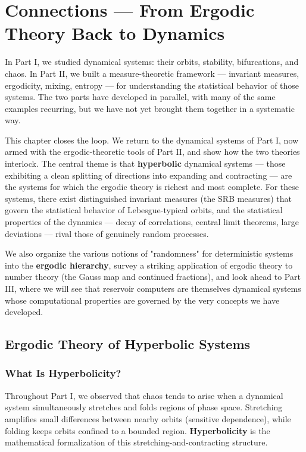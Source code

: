 \chapter{Connections — From Ergodic Theory Back to Dynamics}\label{ch:12}

In Part I, we studied dynamical systems: their orbits, stability, bifurcations, and chaos. In Part II, we built a measure-theoretic framework --- invariant measures, ergodicity, mixing, entropy --- for understanding the statistical behavior of those systems. The two parts have developed in parallel, with many of the same examples recurring, but we have not yet brought them together in a systematic way.

This chapter closes the loop. We return to the dynamical systems of Part I, now armed with the ergodic-theoretic tools of Part II, and show how the two theories interlock. The central theme is that \textbf{hyperbolic} dynamical systems --- those exhibiting a clean splitting of directions into expanding and contracting --- are the systems for which the ergodic theory is richest and most complete. For these systems, there exist distinguished invariant measures (the SRB measures) that govern the statistical behavior of Lebesgue-typical orbits, and the statistical properties of the dynamics --- decay of correlations, central limit theorems, large deviations --- rival those of genuinely random processes.

We also organize the various notions of "randomness" for deterministic systems into the \textbf{ergodic hierarchy}, survey a striking application of ergodic theory to number theory (the Gauss map and continued fractions), and look ahead to Part III, where we will see that reservoir computers are themselves dynamical systems whose computational properties are governed by the very concepts we have developed.


\section{Ergodic Theory of Hyperbolic Systems}\label{sec:12.1}

\subsection{What Is Hyperbolicity?}\label{sec:12.1.1}

Throughout Part I, we observed that chaos tends to arise when a dynamical system simultaneously stretches and folds regions of phase space. Stretching amplifies small differences between nearby orbits (sensitive dependence), while folding keeps orbits confined to a bounded region. \textbf{Hyperbolicity} is the mathematical formalization of this stretching-and-contracting structure.

